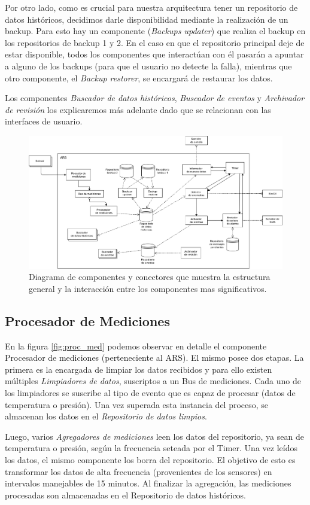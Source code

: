 \par Por otro lado, como es crucial para nuestra arquitectura tener un repositorio de datos históricos, decidimos darle disponibilidad mediante la realización de un backup. Para esto hay un componente (\textit{Backups updater}) que realiza el backup en los repositorios de backup 1 y 2. En el caso en que el repositorio principal deje de estar disponible, todos los componentes que interactúan con él pasarán a apuntar a alguno de los backups (para que el usuario no detecte la falla), mientras que otro componente, el \textit{Backup restorer}, se encargará de restaurar los datos.
\par Los componentes \textit{Buscador de datos históricos}, \textit{Buscador de eventos} y \textit{Archivador de revisión} los explicaremos más adelante dado que se relacionan con las interfaces de usuario.

\newpage
\begin{figure}[H]
  \centering
  \includegraphics[angle=-90,scale=0.52]{imagenes/diagramas/core.png}
  \caption{Diagrama de componentes y conectores que muestra la estructura general y la interacción entre los componentes mas significativos.}
  \label{fig:dia_cyc_core}
\end{figure}
\newpage

\subsection{Procesador de Mediciones}

En la figura \ref{fig:proc_med} podemos observar en detalle el componente Procesador de mediciones (perteneciente al ARS). El mismo posee dos etapas. La primera es la encargada de limpiar los datos recibidos y para ello existen múltiples \textit{Limpiadores de datos}, suscriptos a un Bus de mediciones. Cada uno de los limpiadores se suscribe al tipo de evento que es capaz de procesar (datos de temperatura o presión). Una vez superada esta instancia del proceso, se almacenan los datos en el \textit{Repositorio de datos limpios}.
\par Luego, varios \textit{Agregadores de mediciones} leen los datos del repositorio, ya sean de temperatura o presión, según la frecuencia seteada por el Timer. Una vez leídos los datos, el mismo componente los borra del repositorio. El objetivo de esto es transformar los datos de alta frecuencia (provenientes de los sensores) en intervalos manejables de 15 minutos. Al finalizar la agregación, las mediciones procesadas son almacenadas en el Repositorio de datos históricos.

